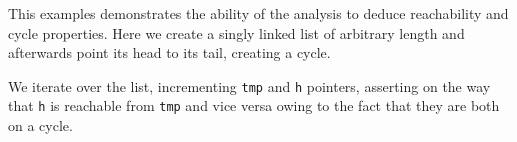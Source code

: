 This examples demonstrates the ability of the analysis to deduce reachability and cycle properties. Here we create a singly linked list of arbitrary length and afterwards point its head to its tail, creating a cycle.

We iterate over the list, incrementing \texttt{tmp} and \texttt{h} pointers, asserting on the way that \texttt{h} is reachable from \texttt{tmp} and vice versa owing to the fact that they are both on a cycle.
